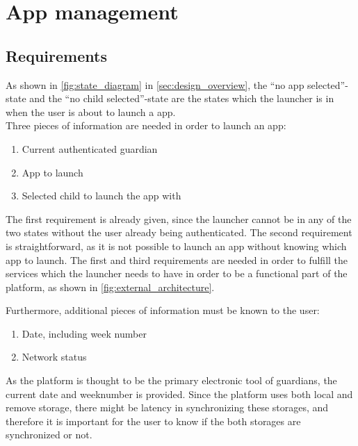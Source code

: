 \section{App management}
\label{sec:app_management}

\subsection{Requirements}
\label{sec:appman_requirements}

As shown in \autoref{fig:state_diagram} in \autoref{sec:design_overview}, the ``no app selected''-state and the ``no child selected''-state are the states which the launcher is in when the user is about to launch a \giraf[] app. \\

\noindent Three pieces of information are needed in order to launch an app:

\begin{enumerate}
	\item Current authenticated guardian
	\item App to launch
	\item Selected child to launch the app with
\end{enumerate}

The first requirement is already given, since the launcher cannot be in any of the two states without the user already being authenticated.
The second requirement is straightforward, as it is not possible to launch an app without knowing which app to launch.
The first and third requirements are needed in order to fulfill the services which the launcher needs to have in order to be a functional part of the \giraf[] platform, as shown in \autoref{fig:external_architecture}.

Furthermore, additional pieces of information must be known to the user:

\begin{enumerate}
	\item Date, including week number
	\item Network status 
\end{enumerate}

As the \giraf[] platform is thought to be the primary electronic tool of guardians, the current date and weeknumber is provided.
Since the \giraf[] platform uses both local and remove storage, there might be latency in synchronizing these storages, and therefore it is important for the user to know if the both storages are synchronized or not.


